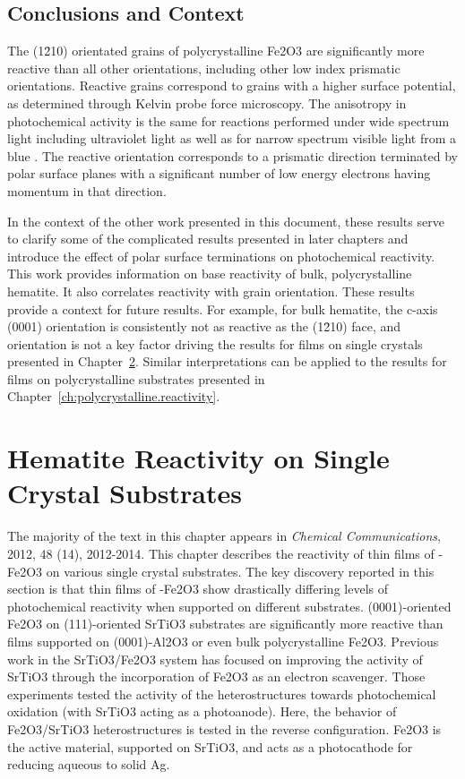\documentclass[12pt,%
              twoside,
               letterpaper]{uiothesis}
\begin{document}
\section{Conclusions and Context}\label{sec:ch9conclusion} 

The (1\={2}10) orientated grains of polycrystalline Fe2O3 are significantly more
reactive than all other orientations, including other low index prismatic orientations.
Reactive grains correspond to grains with a higher surface potential, as determined
through Kelvin probe force microscopy. The anisotropy in photochemical activity is the
same for reactions performed under wide spectrum light including ultraviolet light as well
as for narrow spectrum visible light from a blue . The reactive orientation
corresponds to a prismatic direction terminated by polar surface planes with a significant
number of low energy electrons having momentum in that direction. 

In the context of the other work presented in this document, these results serve to
clarify some of the complicated results presented in later chapters and introduce the
effect of polar surface terminations on photochemical reactivity. This work provides 
information on base reactivity of bulk, polycrystalline hematite. It also correlates
reactivity with grain orientation. These results provide a context for future results. 
For example, for bulk hematite, the c-axis (0001) orientation is consistently not as 
reactive as the (1\={2}10) face, and orientation is not a key factor driving the results 
for films on single crystals presented in Chapter~\ref{ch:single.crystal.reactivity}. Similar 
interpretations can be applied to the results for films on polycrystalline substrates 
presented in Chapter~\ref{ch:polycrystalline.reactivity}. 


\chapter{Hematite Reactivity on Single Crystal Substrates}
\label{ch:single.crystal.reactivity}


The majority of the text in this chapter appears in \emph{Chemical
Communications}, 2012, 48 (14), 2012-2014.\cite{Schultz:2012cr} This chapter describes the
reactivity of thin films of \textalpha-Fe2O3 on various single crystal substrates.
The key discovery reported in this section is that thin films of \textalpha-Fe2O3
show drastically differing levels of photochemical reactivity when supported on different
substrates. (0001)-oriented Fe2O3 on (111)-oriented SrTiO3 substrates are
significantly more reactive than films supported on (0001)-Al2O3 or even bulk
polycrystalline Fe2O3. Previous work in the SrTiO3/Fe2O3 system has focused 
on improving the activity of SrTiO3 through the incorporation of Fe2O3 as an electron
scavenger.\cite{Luo:2006kg,Wang:2007fp} Those experiments tested the activity of the
heterostructures towards photochemical oxidation (with SrTiO3 acting as a
photoanode). Here, the behavior of Fe2O3/SrTiO3 heterostructures is tested in
the reverse configuration. Fe2O3 is the active material, supported on SrTiO3,
and acts as a photocathode for reducing aqueous  to solid Ag.
 
\end{document}
